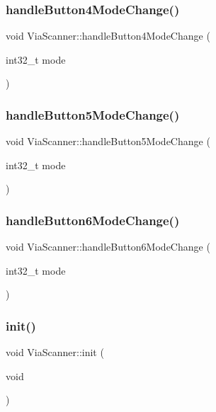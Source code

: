 \subsubsection{\texorpdfstring{handle\+Button4\+Mode\+Change()}{handleButton4ModeChange()}}
{\footnotesize\ttfamily void Via\+Scanner\+::handle\+Button4\+Mode\+Change (\begin{DoxyParamCaption}\item[{int32\+\_\+t}]{mode }\end{DoxyParamCaption})}

\mbox{\label{class_via_scanner_ac1fba594eba26810b22c50448a560867}} 
\subsubsection{\texorpdfstring{handle\+Button5\+Mode\+Change()}{handleButton5ModeChange()}}
{\footnotesize\ttfamily void Via\+Scanner\+::handle\+Button5\+Mode\+Change (\begin{DoxyParamCaption}\item[{int32\+\_\+t}]{mode }\end{DoxyParamCaption})}

\mbox{\label{class_via_scanner_af1bda4e1a5bb52fb27a7dd8dd58f8548}} 
\subsubsection{\texorpdfstring{handle\+Button6\+Mode\+Change()}{handleButton6ModeChange()}}
{\footnotesize\ttfamily void Via\+Scanner\+::handle\+Button6\+Mode\+Change (\begin{DoxyParamCaption}\item[{int32\+\_\+t}]{mode }\end{DoxyParamCaption})}

\mbox{\label{class_via_scanner_a90596d92344fd4bc805b65142dde3e77}} 
\subsubsection{\texorpdfstring{init()}{init()}}
{\footnotesize\ttfamily void Via\+Scanner\+::init (\begin{DoxyParamCaption}\item[{void}]{ }\end{DoxyParamCaption})}

